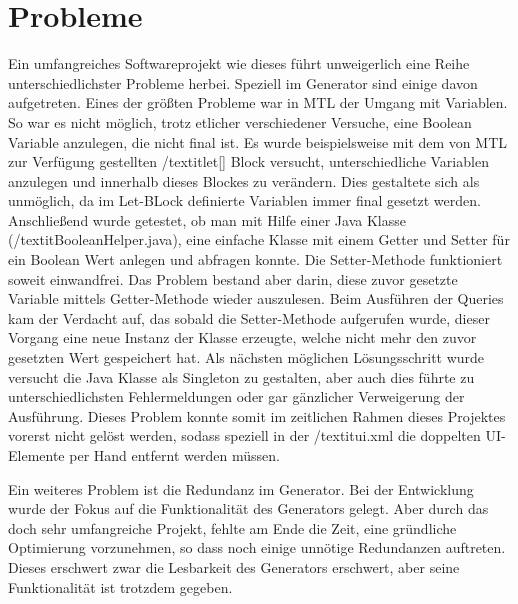 \section{Probleme} \label{Probleme}
Ein umfangreiches Softwareprojekt wie dieses führt unweigerlich eine Reihe unterschiedlichster Probleme herbei. Speziell im Generator sind einige davon aufgetreten.
Eines der größten Probleme war in MTL der Umgang mit Variablen. So war es nicht möglich, trotz etlicher verschiedener Versuche, eine Boolean Variable anzulegen, die nicht final ist. Es wurde beispielsweise mit dem von MTL zur Verfügung gestellten /textit{let[]} Block versucht, unterschiedliche Variablen anzulegen und innerhalb dieses Blockes zu verändern. Dies gestaltete sich als unmöglich, da im Let-BLock definierte Variablen immer final gesetzt werden. Anschließend wurde getestet, ob man mit Hilfe einer Java Klasse (/textit{BooleanHelper.java}), eine einfache Klasse mit einem Getter und Setter für ein Boolean Wert anlegen und abfragen konnte. Die Setter-Methode funktioniert soweit einwandfrei. Das Problem bestand aber darin, diese zuvor gesetzte Variable mittels Getter-Methode wieder auszulesen. Beim Ausführen der Queries kam der Verdacht auf, das sobald die Setter-Methode aufgerufen wurde, dieser Vorgang eine neue Instanz der Klasse erzeugte, welche nicht mehr den zuvor gesetzten Wert gespeichert hat. Als nächsten möglichen Lösungsschritt wurde versucht die Java Klasse als Singleton zu gestalten, aber auch dies führte zu unterschiedlichsten Fehlermeldungen oder gar gänzlicher Verweigerung der Ausführung. 
Dieses Problem konnte somit im zeitlichen Rahmen dieses Projektes vorerst nicht gelöst werden, sodass speziell in der /textit{ui.xml} die doppelten UI-Elemente per Hand entfernt werden müssen.
 
Ein weiteres Problem ist die Redundanz im Generator. Bei der Entwicklung wurde der Fokus auf die Funktionalität des Generators gelegt. Aber durch das doch sehr umfangreiche Projekt, fehlte am Ende die Zeit, eine gründliche Optimierung vorzunehmen, so dass noch einige unnötige Redundanzen auftreten. Dieses erschwert zwar die Lesbarkeit des Generators erschwert, aber seine Funktionalität ist trotzdem gegeben.